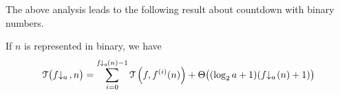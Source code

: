 The above analysis leads to the following result about countdown with binary numbers.
\begin{thm} \label{thm: cdt-runtime-bin}
	If $n$ is represented in binary, we have
	\begin{equation*}
	\runtime\big(\cdt{f}{a}\ , n\big) = \sum_{i=0}^{\cdt{f}{a}(n) - 1}
	\runtime\left(f, f^{(i)}(n)\right) + \Theta\big((\log_2a + 1)(\cdt{f}{a}(n) + 1)\big)
	\end{equation*}
\end{thm}

